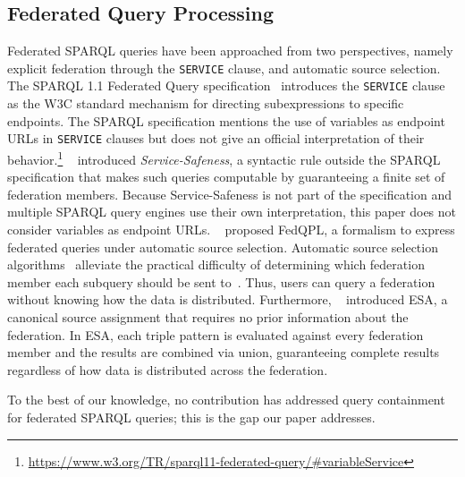 \subsection{Federated Query Processing}\label{sec:related_works_fed}

Federated SPARQL queries have been approached from two perspectives, namely explicit federation through the \texttt{SERVICE} clause, and automatic source selection.
The SPARQL 1.1 Federated Query specification~\cite{w3SPARQLFederated} introduces the \texttt{SERVICE} clause as the W3C standard mechanism for directing subexpressions to specific endpoints.
The SPARQL specification mentions the use of variables as endpoint URLs in \texttt{SERVICE} clauses but does not give an official interpretation of their behavior.\footnote{\url{https://www.w3.org/TR/sparql11-federated-query/\#variableService}}
\citeauthor{BuilAranda2013}~\cite{BuilAranda2013} introduced \emph{Service-Safeness}, a syntactic rule outside the SPARQL specification that makes such queries computable by guaranteeing a finite set of federation members.
Because Service-Safeness is not part of the specification and multiple SPARQL query engines use their own interpretation, this paper does not consider variables as endpoint URLs.
\citeauthor{Cheng2021}~\cite{Cheng2021} proposed FedQPL, a formalism to express federated queries under automatic source selection.
Automatic source selection algorithms~\cite{schwarte2011fedx, gorlitz2011splendid, acosta2011anapsid, charalambidis2015semagrow, saleem2018costfed, taelman_iswc_resources_comunica_2018} alleviate the practical difficulty of determining which federation member each subquery should be sent to~\cite{hanski2025observations}.
Thus, users can query a federation without knowing how the data is distributed.
Furthermore, \citeauthor{Cheng2021}~\cite{Cheng2021} introduced \ac{ESA}, a canonical source assignment that requires no prior information about the federation.
In \ac{ESA}, each triple pattern is evaluated against every federation member and the results are combined via union, guaranteeing complete results regardless of how data is distributed across the federation.

To the best of our knowledge, no contribution has addressed query containment for federated SPARQL queries; this is the gap our paper addresses.
